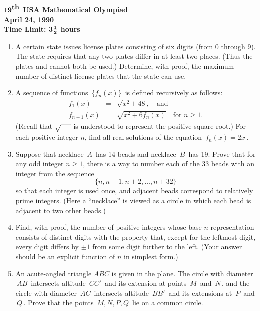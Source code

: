 \def\dg{^\circ}

\begin{center}
${\bf 19}^{\mbox{\bf th}}$ {\bf USA 
Mathematical 
Olympiad} 
\\[.1in] 
{\bf April 24, 1990}\\ 
{\bf Time Limit: 3}${{\bf 1}\over{\bf 2}}$ {\bf 
hours} 
\end{center} 
\begin{enumerate} 
\item
A certain state issues license plates consisting of six digits (from 0 
through 9). The state requires that any two plates differ in at least two 
places. (Thus the plates  and  cannot both be 
used.) Determine, with proof, the maximum number of distinct license 
plates that the state can use.
\item
A sequence of functions $\, \{f_n(x) \} \,$ is defined recursively as follows:
\begin{eqnarray*}
f_1(x) &=& \sqrt{x^2 + 48}, \quad \mbox{and} \\
f_{n+1}(x) &=& \sqrt{x^2 + 6f_n(x)} \quad \mbox{for $n \geq 1$.}
\end{eqnarray*}
(Recall that $\sqrt{\makebox[5mm]{}}$
is understood to represent the positive square root.)
For each positive integer $n$, find all real solutions of the equation 
$\, f_n(x) = 2x \,$.
\item 
Suppose that necklace $\, A \,$ has 14 beads and necklace $\, B \,$ has 
19. Prove that for any odd integer $n \geq 1$, there is a way to number 
each of the 33 beads with an integer from the sequence
\[
\{ n, n+1, n+2, \dots, n+32 \}
\]
so that each integer is used once, and adjacent beads correspond to 
relatively prime integers. (Here a ``necklace'' is viewed as a circle in 
which each bead is adjacent to two other beads.)
\item 
Find, with proof, the number of positive integers whose base-$n$ 
representation consists of distinct digits with the property that, except 
for the leftmost digit, every digit differs by $\pm 1$ from some digit 
further to the left.
(Your answer should be an explicit function of $n$ in simplest form.)
\item 
An acute-angled triangle $ABC$ is given in the plane. The circle with 
diameter $\, AB \,$ intersects altitude $\, CC' \,$ and its extension at 
points $\, M \,$ and $\, N \,$, and the circle with diameter $\, AC \,$ 
intersects altitude $\, BB' \,$ and its extensions at $\, P \,$ and $\, Q 
\,$. Prove that the points $\, M, N, P, Q \,$ lie on a common circle.
\end{enumerate} 
